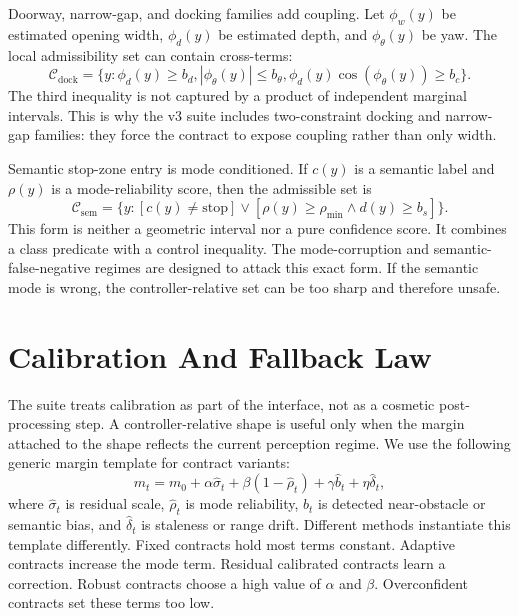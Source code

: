\documentclass{article}
\newcommand{\contract}{\mathcal{C}}
\begin{document}
Doorway, narrow-gap, and docking families add coupling. Let $\phi_w(y)$ be estimated opening width, $\phi_d(y)$ be estimated depth, and $\phi_\theta(y)$ be yaw. The local admissibility set can contain cross-terms:
\begin{equation}
    \contract_{\mathrm{dock}}
    =
    \{y:
    \phi_d(y)\geq b_d,
    |\phi_\theta(y)|\leq b_\theta,
    \phi_d(y)\cos(\phi_\theta(y))\geq b_c
    \}.
\end{equation}
The third inequality is not captured by a product of independent marginal intervals. This is why the v3 suite includes two-constraint docking and narrow-gap families: they force the contract to expose coupling rather than only width.

Semantic stop-zone entry is mode conditioned. If $c(y)$ is a semantic label and $\rho(y)$ is a mode-reliability score, then the admissible set is
\begin{equation}
    \contract_{\mathrm{sem}}
    =
    \{y:
    [c(y)\neq \mathrm{stop}]
    \lor
    [\rho(y)\geq \rho_{\min}\land d(y)\geq b_s]\}.
\end{equation}
This form is neither a geometric interval nor a pure confidence score. It combines a class predicate with a control inequality. The mode-corruption and semantic-false-negative regimes are designed to attack this exact form. If the semantic mode is wrong, the controller-relative set can be too sharp and therefore unsafe.

\section{Calibration And Fallback Law}

The suite treats calibration as part of the interface, not as a cosmetic post-processing step. A controller-relative shape is useful only when the margin attached to the shape reflects the current perception regime. We use the following generic margin template for contract variants:
\begin{equation}
    m_t
    =
    m_0
    + \alpha \widehat{\sigma}_t
    + \beta (1-\widehat{\rho}_t)
    + \gamma \widehat{b}_t
    + \eta \widehat{\delta}_t,
\end{equation}
where $\widehat{\sigma}_t$ is residual scale, $\widehat{\rho}_t$ is mode reliability, $\widehat{b}_t$ is detected near-obstacle or semantic bias, and $\widehat{\delta}_t$ is staleness or range drift. Different methods instantiate this template differently. Fixed contracts hold most terms constant. Adaptive contracts increase the mode term. Residual calibrated contracts learn a correction. Robust contracts choose a high value of $\alpha$ and $\beta$. Overconfident contracts set these terms too low.
\end{document}

